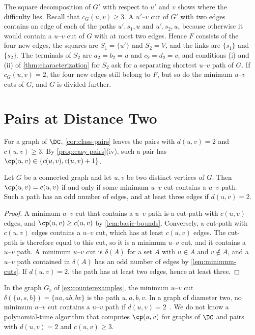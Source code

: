 The square decomposition of $G'$ with respect to $u'$ and $v$ shows where the difficulty lies.
Recall that $c_G(u, v) \geq 3$.
A $u'$--$v$ cut of $G'$ with two edges contains an edge of each of the paths $u', s_1, u$ and $u', s_2, u$, because otherwise it would contain a $u$--$v$ cut of $G$ with at most two edges.
Hence $F$ consists of the four new edges, the squares are $S_1 = \{u'\}$ and $S_2 = V$, and the links are $\{s_1\}$ and $\{s_2\}$.
The terminals of $S_2$ are $a_2 = b_2 = u$ and $c_2 = d_2 = v$, and conditions (i) and (ii) of \cref{thm:characterization} for $S_2$ ask for a separating shortest $u$--$v$ path of $G$.
If $c_G(u, v) = 2$, the four new edges still belong to $F$, but so do the minimum $u$--$v$ cuts of $G$, and $G$ is divided further.

\section{Pairs at Distance Two}
\label{sec:distance-two}

For a graph of $\DC$, \cref{cor:class-pairs} leaves the pairs with $d(u, v) = 2$ and $c(u, v) \geq 3$.
By \cref{prop:easy-pairs}(iv), such a pair has $\cp(u, v) \in \{c(u, v), c(u, v) + 1\}$.

\begin{proposition}
\label{prop:open-pairs}
Let $G$ be a connected graph and let $u, v$ be two distinct vertices of $G$.
Then $\cp(u, v) = c(u, v)$ if and only if some minimum $u$--$v$ cut contains a $u$--$v$ path.
Such a path has an odd number of edges, and at least three edges if $d(u, v) = 2$.
\end{proposition}

\begin{proof}
A minimum $u$--$v$ cut that contains a $u$--$v$ path is a cut-path with $c(u, v)$ edges, and $\cp(u, v) \geq c(u, v)$ by \cref{lem:basic-bounds}.
Conversely, a cut-path with $c(u, v)$ edges contains a $u$--$v$ cut, which has at least $c(u, v)$ edges.
The cut-path is therefore equal to this cut, so it is a minimum $u$--$v$ cut, and it contains a $u$--$v$ path.
A minimum $u$--$v$ cut is $\delta(A)$ for a set $A$ with $u \in A$ and $v \notin A$, and a $u$--$v$ path contained in $\delta(A)$ has an odd number of edges by \cref{lem:minimum-cuts}.
If $d(u, v) = 2$, the path has at least two edges, hence at least three.
\end{proof}

In the graph $G_b$ of \cref{ex:counterexamples}, the minimum $u$--$v$ cut $\delta(\{u, s, b\}) = \{ua, ab, bv\}$ is the path $u, a, b, v$.
In a graph of diameter two, no minimum $u$--$v$ cut contains a $u$--$v$ path if $d(u, v) = 2$~\cite[Theorem~5.5]{Michel2026MinCutPath}.
We do not know a polynomial-time algorithm that computes $\cp(u, v)$ for graphs of $\DC$ and pairs with $d(u, v) = 2$ and $c(u, v) \geq 3$.
